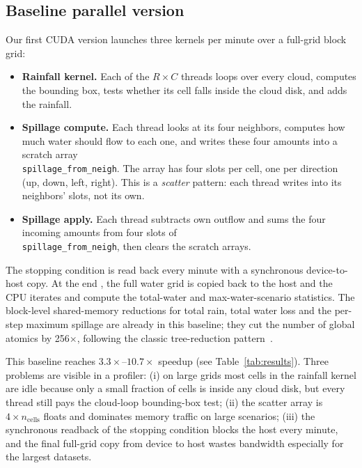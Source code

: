 \documentclass[sigconf, nonacm, review]{acmart}
\begin{document}
\subsection{Baseline parallel version}\label{sec:baseline}
Our first CUDA version launches three kernels per minute over a
full-grid block grid:

\begin{itemize}
  \item \textbf{Rainfall kernel.} Each of the $R{\times}C$ threads
    loops over every cloud, computes the bounding box, tests whether
    its cell falls inside the cloud disk, and adds the rainfall.
  \item \textbf{Spillage compute.} Each thread looks at its
    four neighbors, computes how much water should flow to
    each one, and writes these four amounts into a scratch
    array\\
    \texttt{spillage\_from\_neigh}. The array has four
    slots per cell, one per direction (up, down, left, right).
    This is a \emph{scatter} pattern: each thread writes into
    its neighbors' slots, not its own.
  \item \textbf{Spillage apply.} Each thread subtracts own
    outflow and sums the four incoming amounts from four
    slots of\\
    \texttt{spillage\_from\_neigh}, then clears the scratch
    arrays.
\end{itemize}

The stopping condition is read back every minute with a
synchronous device-to-host copy. At the end
, the full water grid is copied back to the
host and the CPU iterates and compute the total-water
and max-water-scenario statistics. The block-level
shared-memory reductions for total rain, total water loss and
the per-step maximum spillage are already in this baseline;
they cut the number of global atomics by 256$\times$, following
the classic tree-reduction pattern~\cite{harris2007reduction}.

This baseline reaches $3.3\times$--$10.7\times$ speedup
(see Table~\ref{tab:results}). Three problems are visible in a
profiler:
(i) on large grids most cells in the rainfall kernel are idle
because only a small fraction of cells is inside any cloud disk,
but every thread still pays the cloud-loop bounding-box test;
(ii) the scatter array is $4{\times}n_\text{cells}$ floats and
dominates memory traffic on large scenarios;
(iii) the synchronous readback of the stopping condition blocks
the host every minute, and the final full-grid copy from device
to host wastes bandwidth especially for the largest datasets.
\end{document}
